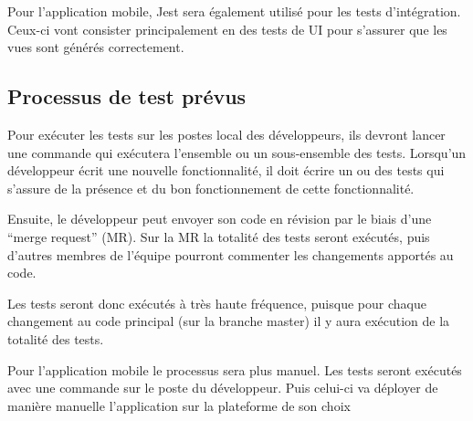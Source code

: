 	Pour l’application mobile, Jest sera également utilisé pour les tests d’intégration. Ceux-ci vont consister principalement en des tests de UI pour s’assurer que les vues sont générés correctement. 

	\subsection{Processus de test prévus}
	Pour exécuter les tests sur les postes local des développeurs, ils devront lancer une commande qui exécutera l’ensemble ou un sous-ensemble des tests. Lorsqu’un développeur écrit une nouvelle fonctionnalité, il doit écrire un ou des tests qui s’assure de la présence et du bon fonctionnement de cette fonctionnalité. 

	Ensuite, le développeur peut envoyer son code en révision par le biais d’une “merge request” (MR). Sur la MR la totalité des tests seront exécutés, puis d’autres membres de l’équipe pourront commenter les changements apportés au code. 

	Les tests seront donc exécutés à très haute fréquence, puisque pour chaque changement au code principal (sur la branche master) il y aura exécution de la totalité des tests. 

	Pour l’application mobile le processus sera plus manuel. Les tests seront exécutés avec une commande sur le poste du développeur. Puis celui-ci va déployer de manière manuelle l’application sur la plateforme de son choix
